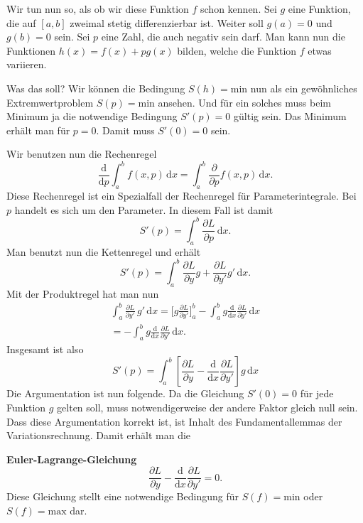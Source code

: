 \documentclass[a4paper,11pt,fleqn,twocolumn,twoside]{scrartcl}
\numberwithin{equation}{section}
\begin{document}
Wir tun nun so, als ob wir diese Funktion $f$ schon kennen.
Sei $g$ eine Funktion, die auf $[a,b]$ zweimal stetig
differenzierbar ist. Weiter soll $g(a)=0$ und $g(b)=0$
sein. Sei $p$ eine Zahl, die auch negativ sein darf. Man
kann nun die Funktionen $h(x)=f(x)+pg(x)$ bilden, welche
die Funktion $f$ etwas variieren.

Was das soll? Wir können die Bedingung $S(h)=\mathrm{min}$ nun als
ein gewöhnliches Extremwertproblem $S(p)=\mathrm{min}$ ansehen.
Und für ein solches muss beim Minimum ja die notwendige Bedingung
$S'(p)=0$ gültig sein. Das Minimum erhält man für $p=0$.
Damit muss $S'(0)=0$ sein.

Wir benutzen nun die Rechenregel
\begin{equation}
\frac{\mathrm d}{\mathrm dp}\int_a^b f(x,p)\,\mathrm dx =
\int_a^b \frac{\partial}{\partial p}f(x,p)\,\mathrm dx.
\end{equation}
Diese Rechenregel ist ein Spezialfall der Rechenregel für
Parameterintegrale. Bei $p$ handelt es sich um den Parameter.
In diesem Fall ist damit
\begin{equation}
S'(p) = \int_a^b \frac{\partial L}{\partial p}\,\mathrm dx.
\end{equation}
Man benutzt nun die Kettenregel und erhält
\begin{equation}
S'(p) = \int_a^b \frac{\partial L}{\partial y}g
  +\frac{\partial L}{\partial y'}g'\,\mathrm dx.
\end{equation}
Mit der Produktregel hat man nun
\begin{gather*}
\int_a^b \frac{\partial L}{\partial y'}\,g'\,\mathrm dx
= \Big[g\frac{\partial L}{\partial y'}\Big]_a^b
- \int_a^b g \frac{\mathrm d}{\mathrm dx}
\frac{\partial L}{\partial y'}\,\mathrm dx\\
= - \int_a^b g \frac{\mathrm d}{\mathrm dx}
\frac{\partial L}{\partial y'}\,\mathrm dx.
\end{gather*}
Insgesamt ist also
\begin{equation}
S'(p) = \int_a^b \left[\frac{\partial L}{\partial y}
-\frac{\mathrm d}{\mathrm dx}\frac{\partial L}{\partial y'}
\right]g\,\mathrm dx
\end{equation}
Die Argumentation ist nun folgende. Da die Gleichung $S'(0)=0$
für jede Funktion $g$ gelten soll, muss notwendigerweise der andere
Faktor gleich null sein. Dass diese Argumentation korrekt ist, ist
Inhalt des Fundamentallemmas der Variationsrechnung.
Damit erhält man die

\textbf{Euler-Lagrange-Gleichung}
\begin{equation}
\frac{\partial L}{\partial y}
-\frac{\mathrm d}{\mathrm dx}\frac{\partial L}{\partial y'}
=0.
\end{equation}
Diese Gleichung stellt eine notwendige Bedingung für
$S(f)=\mathrm{min}$ oder $S(f)=\mathrm{max}$ dar.
\end{document}
